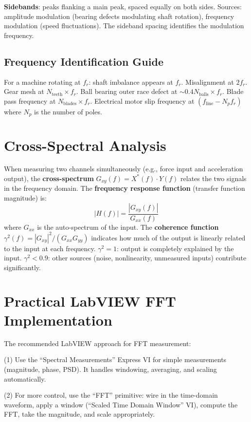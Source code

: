 \documentclass[11pt,letterpaper,twoside,openany]{book}
\begin{document}
\textbf{Sidebands}: peaks flanking a main peak, spaced equally on both sides. Sources: amplitude modulation (bearing defects modulating shaft rotation), frequency modulation (speed fluctuations). The sideband spacing identifies the modulation frequency.

\subsection{Frequency Identification Guide}
For a machine rotating at $f_r$: shaft imbalance appears at $f_r$. Misalignment at $2f_r$. Gear mesh at $N_{\text{teeth}} \times f_r$. Ball bearing outer race defect at $\sim 0.4 N_{\text{balls}} \times f_r$. Blade pass frequency at $N_{\text{blades}} \times f_r$. Electrical motor slip frequency at $(f_{\text{line}} - N_p f_r)$ where $N_p$ is the number of poles.

\section{Cross-Spectral Analysis}
When measuring two channels simultaneously (e.g., force input and acceleration output), the \textbf{cross-spectrum} $G_{xy}(f) = X^*(f) \cdot Y(f)$ relates the two signals in the frequency domain. The \textbf{frequency response function} (transfer function magnitude) is:
\begin{equation}
|H(f)| = \frac{|G_{xy}(f)|}{G_{xx}(f)}
\end{equation}
where $G_{xx}$ is the auto-spectrum of the input. The \textbf{coherence function} $\gamma^2(f) = |G_{xy}|^2/(G_{xx} G_{yy})$ indicates how much of the output is linearly related to the input at each frequency. $\gamma^2 = 1$: output is completely explained by the input. $\gamma^2 < 0.9$: other sources (noise, nonlinearity, unmeasured inputs) contribute significantly.

\section{Practical LabVIEW FFT Implementation}
The recommended LabVIEW approach for FFT measurement:

(1) Use the ``Spectral Measurements'' Express VI for simple measurements (magnitude, phase, PSD). It handles windowing, averaging, and scaling automatically.

(2) For more control, use the ``FFT'' primitive: wire in the time-domain waveform, apply a window (``Scaled Time Domain Window'' VI), compute the FFT, take the magnitude, and scale appropriately.
\end{document}

